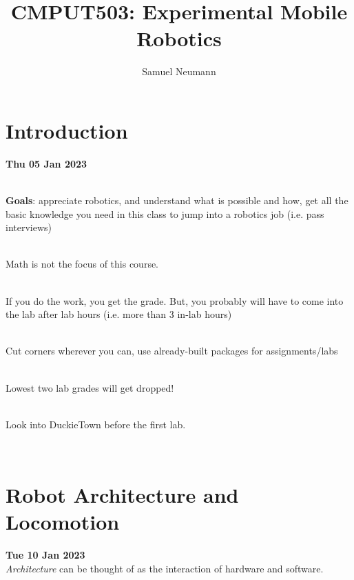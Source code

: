\documentclass[13pt]{article}
\title{CMPUT503: Experimental Mobile Robotics}
\author{Samuel Neumann}
\begin{document}
\maketitle

\section{Introduction}
\hfill  \textbf{Thu 05 Jan 2023}

\hfill \\

\noindent
\textbf{Goals}: appreciate robotics, and understand what is possible and how, get all the basic knowledge you need in
this class to jump into a robotics job (i.e. pass interviews)

\hfill \\
\noindent
Math is not the focus of this course.

\hfill \\
\noindent
If you do the work, you get the grade. But, you probably will have to come into the lab after lab hours (i.e. more than
3 in-lab hours)

\hfill \\
\noindent
Cut corners wherever you can, use already-built packages for assignments/labs

\hfill \\
\noindent
Lowest two lab grades will get dropped!

\hfill \\
\noindent
Look into DuckieTown before the first lab.

\hfill \\

\section{Robot Architecture and Locomotion}%
\hfill \textbf{Tue 10 Jan 2023} \\

\noindent
\textit{Architecture} can be thought of as the interaction of hardware and software.
\end{document}
